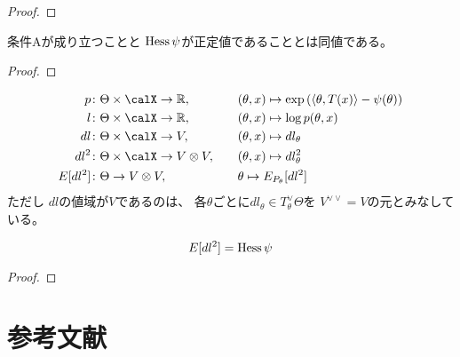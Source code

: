 \documentclass[report]{jlreq}
\begin{document}
\begin{proof}
    \TODO{}
\end{proof}

\begin{proposition}
    条件Aが成り立つことと
    $\operatorname{Hess}\psi$が正定値であることとは同値である。
\end{proposition}

\begin{proof}
    \TODO{}
\end{proof}

\begin{definition}[スコア関数]
    \begin{alignat}{2}
        p
            &\colon \Theta \times \calX \to \R, \quad
            &&(\theta, x) \mapsto \exp\myparen{
                \langle \theta, T(x) \rangle - \psi(\theta)
            }
            \\
        l
            &\colon \Theta \times \calX \to \R, \quad
            &&(\theta, x) \mapsto \log p(\theta, x)
            \\
        dl
            &\colon \Theta \times \calX \to V, \quad
            &&(\theta, x) \mapsto dl_\theta
            \\
        dl^2
            &\colon \Theta \times \calX \to V \otimes V, \quad
            &&(\theta, x) \mapsto dl_\theta^2
            \\
        E[dl^2]
            &\colon \Theta \to V \otimes V, \quad
            &&\theta \mapsto E_{P_\theta}[dl^2]
    \end{alignat}
    ただし
    $dl$の値域が$V$であるのは、
    各$\theta$ごとに$dl_\theta \in T^\vee_\theta \Theta$を
    $V^{\vee\vee} = V$の元とみなしている。
\end{definition}

\begin{proposition}
    \begin{equation}
        E[dl^2] = \operatorname{Hess}\psi
    \end{equation}
\end{proposition}

\begin{proof}
    \TODO{}
\end{proof}



%
\section*{参考文献}

\nocite{amari_information_2016}

{
    \renewcommand{\bibsection}{}
    
    
}
\end{document}
